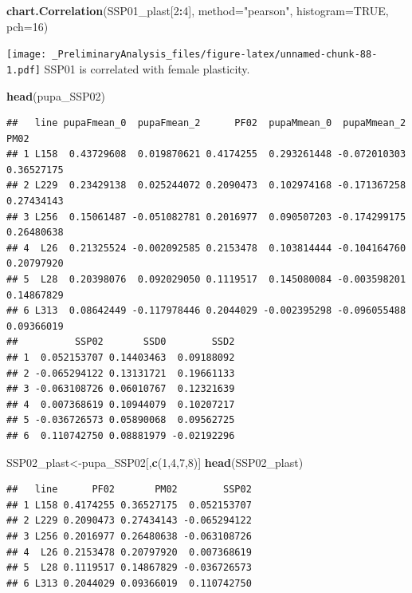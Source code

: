 \documentclass[
]{article}
\newenvironment{Shaded}{\begin{snugshade}}{\end{snugshade}}
\newcommand{\DataTypeTok}[1]{\textcolor[rgb]{0.13,0.29,0.53}{#1}}
\newcommand{\DecValTok}[1]{\textcolor[rgb]{0.00,0.00,0.81}{#1}}
\newcommand{\KeywordTok}[1]{\textcolor[rgb]{0.13,0.29,0.53}{\textbf{#1}}}
\newcommand{\NormalTok}[1]{#1}
\newcommand{\OperatorTok}[1]{\textcolor[rgb]{0.81,0.36,0.00}{\textbf{#1}}}
\newcommand{\OtherTok}[1]{\textcolor[rgb]{0.56,0.35,0.01}{#1}}
\newcommand{\StringTok}[1]{\textcolor[rgb]{0.31,0.60,0.02}{#1}}
\begin{document}
\begin{Shaded}
\begin{Highlighting}[]
\KeywordTok{chart.Correlation}\NormalTok{(SSP01_plast[}\DecValTok{2}\OperatorTok{:}\DecValTok{4}\NormalTok{],}
                   \DataTypeTok{method=}\StringTok{"pearson"}\NormalTok{,}
                   \DataTypeTok{histogram=}\OtherTok{TRUE}\NormalTok{,}
                   \DataTypeTok{pch=}\DecValTok{16}\NormalTok{)}
\end{Highlighting}
\end{Shaded}

\texttt{[image: \_PreliminaryAnalysis\_files/figure-latex/unnamed-chunk-88-1.pdf]}
SSP01 is correlated with female plasticity.

\begin{Shaded}
\begin{Highlighting}[]
\KeywordTok{head}\NormalTok{(pupa_SSP02)}
\end{Highlighting}
\end{Shaded}

\begin{verbatim}
##   line pupaFmean_0  pupaFmean_2      PF02  pupaMmean_0  pupaMmean_2       PM02
## 1 L158  0.43729608  0.019870621 0.4174255  0.293261448 -0.072010303 0.36527175
## 2 L229  0.23429138  0.025244072 0.2090473  0.102974168 -0.171367258 0.27434143
## 3 L256  0.15061487 -0.051082781 0.2016977  0.090507203 -0.174299175 0.26480638
## 4  L26  0.21325524 -0.002092585 0.2153478  0.103814444 -0.104164760 0.20797920
## 5  L28  0.20398076  0.092029050 0.1119517  0.145080084 -0.003598201 0.14867829
## 6 L313  0.08642449 -0.117978446 0.2044029 -0.002395298 -0.096055488 0.09366019
##          SSP02       SSD0        SSD2
## 1  0.052153707 0.14403463  0.09188092
## 2 -0.065294122 0.13131721  0.19661133
## 3 -0.063108726 0.06010767  0.12321639
## 4  0.007368619 0.10944079  0.10207217
## 5 -0.036726573 0.05890068  0.09562725
## 6  0.110742750 0.08881979 -0.02192296
\end{verbatim}

\begin{Shaded}
\begin{Highlighting}[]
\NormalTok{SSP02_plast<-pupa_SSP02[,}\KeywordTok{c}\NormalTok{(}\DecValTok{1}\NormalTok{,}\DecValTok{4}\NormalTok{,}\DecValTok{7}\NormalTok{,}\DecValTok{8}\NormalTok{)]}
\KeywordTok{head}\NormalTok{(SSP02_plast)}
\end{Highlighting}
\end{Shaded}

\begin{verbatim}
##   line      PF02       PM02        SSP02
## 1 L158 0.4174255 0.36527175  0.052153707
## 2 L229 0.2090473 0.27434143 -0.065294122
## 3 L256 0.2016977 0.26480638 -0.063108726
## 4  L26 0.2153478 0.20797920  0.007368619
## 5  L28 0.1119517 0.14867829 -0.036726573
## 6 L313 0.2044029 0.09366019  0.110742750
\end{verbatim}
\end{document}
